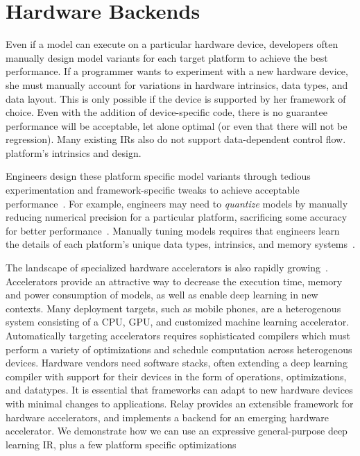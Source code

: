 \section{Hardware Backends}

Even if a model can execute on
  a particular hardware device, developers
  often manually design model
  variants for each target platform
  to achieve the best performance.
If a programmer wants to experiment with a new hardware device,
  she must manually account for variations in hardware intrinsics, data
  types, and data layout.
This is only possible if the device is supported by her framework of choice.
Even with the addition of device-specific code,
  there is no guarantee performance will be acceptable, let alone optimal
  (or even that there will not be regression).
Many existing IRs also do not support data-dependent control flow.
  platform's intrinsics and design.

Engineers design these platform specific model variants
  through tedious experimentation and framework-specific tweaks
  to achieve acceptable performance~\citep{mobilenet}. %
For example,
  engineers may need to \textit{quantize} models
  by manually reducing numerical precision for a particular platform,
  sacrificing some accuracy for better performance~\citep{xnornet}.
Manually tuning models requires
  that engineers learn the details of
  each platform's
  unique data types, intrinsics, and memory systems~\citep{fb_fp_hw, tpuv1, brainwave, nn_on_si}.

The landscape of specialized hardware
  accelerators is also rapidly growing~\citep{
    moreau2018vta, OpenTPU, tpuv1}.
Accelerators provide an attractive way to decrease
  the execution time, memory and power consumption of models, as well
  as enable deep learning in new contexts.
Many deployment targets, such as mobile phones, are a heterogenous system
  consisting of a CPU, GPU, and customized machine learning accelerator.
Automatically targeting accelerators requires sophisticated compilers which
  must perform a variety of optimizations and schedule computation across
  heterogenous devices.
Hardware vendors need software stacks, often extending a deep learning
  compiler with support for their devices in the form of operations,
  optimizations, and datatypes.
It is essential that frameworks can adapt to new hardware devices
  with minimal changes to applications.
Relay provides an extensible framework for hardware accelerators,
  and implements a backend for \vta an emerging hardware accelerator\citep{moreau2018vta}.
We demonstrate how we can use an expressive general-purpose deep learning IR, plus
  a few platform specific optimizations

